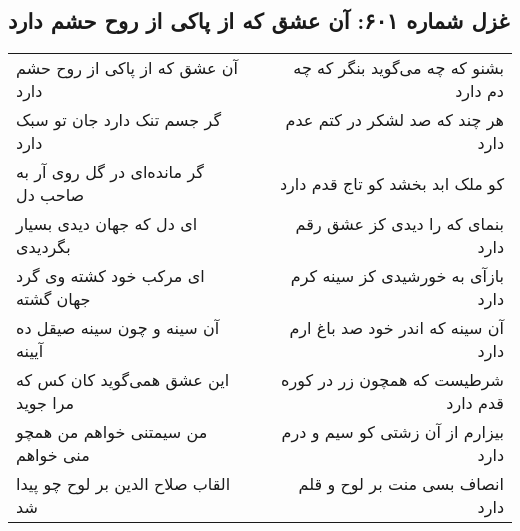 \begin{center}
\section*{غزل شماره ۶۰۱: آن عشق که از پاکی از روح حشم دارد}
\label{sec:0601}
\begin{longtable}{l p{0.5cm} r}
آن عشق که از پاکی از روح حشم دارد
&&
بشنو که چه می‌گوید بنگر که چه دم دارد
\\
گر جسم تنک دارد جان تو سبک دارد
&&
هر چند که صد لشکر در کتم عدم دارد
\\
گر مانده‌ای در گل روی آر به صاحب دل
&&
کو ملک ابد بخشد کو تاج قدم دارد
\\
ای دل که جهان دیدی بسیار بگردیدی
&&
بنمای که را دیدی کز عشق رقم دارد
\\
ای مرکب خود کشته وی گرد جهان گشته
&&
بازآی به خورشیدی کز سینه کرم دارد
\\
آن سینه و چون سینه صیقل ده آیینه
&&
آن سینه که اندر خود صد باغ ارم دارد
\\
این عشق همی‌گوید کان کس که مرا جوید
&&
شرطیست که همچون زر در کوره قدم دارد
\\
من سیمتنی خواهم من همچو منی خواهم
&&
بیزارم از آن زشتی کو سیم و درم دارد
\\
القاب صلاح الدین بر لوح چو پیدا شد
&&
انصاف بسی منت بر لوح و قلم دارد
\\
\end{longtable}
\end{center}
